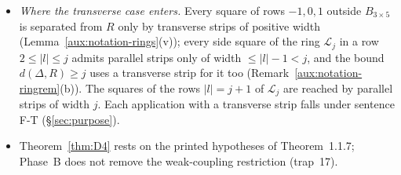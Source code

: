 \begin{itemize}
\begin{itemize}
$\|V(h')^2\|_{L^2(d\varphi_0)}$, for the constructed $V(h')$ (Lemma~\ref{aux:notation-hyper};
conditional on R8; no GAP);
\item $C_7c_U\overline\Sigma_{3\times5}$ is Lemma~\ref{lem:D2}(a) summed over the rings
(conditional on Lemma~C.4, R1--R10, through Lemma~\ref{lem:D2}),
$\overline\Sigma_{3\times5}$ bounding the sum of $e^{-m_1w_\Delta}$ over the charged squares
outside $B_{3\times5}$;
\item the last factor bounds $\GJS{Q_V}$ as in eq.~(5) of the record \cite[p.~19]{R}, whose
``$=M^2/C_8$'' no longer applies (plan, item n14).
\end{itemize}
\item \emph{Where the transverse case enters.} Every square of rows $-1,0,1$ outside
$B_{3\times5}$ is separated from $R$ only by transverse strips of positive width
(Lemma~\ref{aux:notation-rings}(v)); every side square of the ring $\mathcal L_j$ in a row
$2\le|l|\le j$ admits parallel strips only of width $\le|l|-1<j$, and the bound
$d(\Delta,R)\ge j$ uses a transverse strip for it too
(Remark~\ref{aux:notation-ringrem}(b)). The squares of the rows $|l|=j+1$ of $\mathcal L_j$
are reached by parallel strips of width $j$. Each application with a transverse strip falls
under sentence F-T (\S\ref{sec:purpose}).
\item Theorem~\ref{thm:D4} rests on the printed hypotheses of Theorem~1.1.7; Phase~B does not
remove the weak-coupling restriction (trap~17).
\end{itemize}

